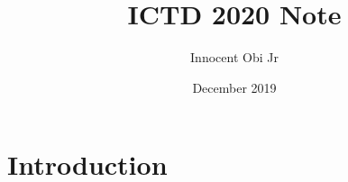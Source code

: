 \documentclass{article}
\title{ICTD 2020 Note}
\author{Innocent Obi Jr}
\date{December 2019}
\begin{document}
\maketitle

\section{Introduction}
\end{document}

